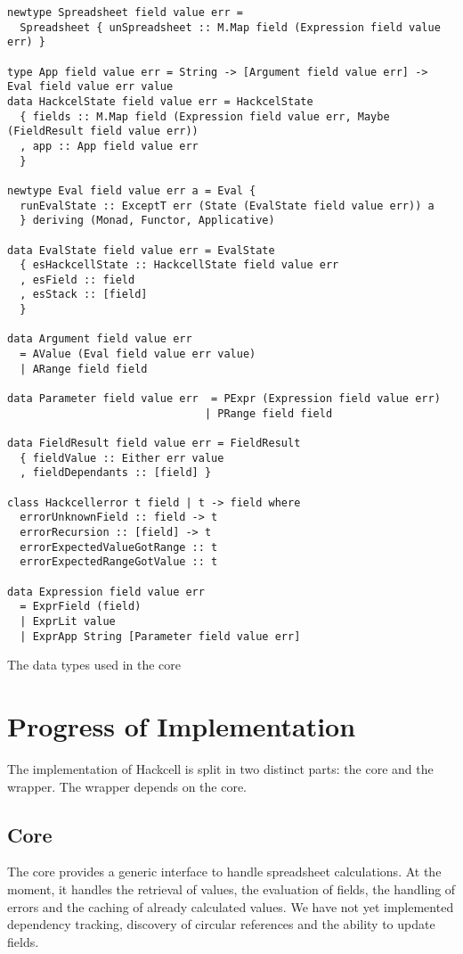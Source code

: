 \documentclass{article}
\begin{document}
	\begin{listing}
	\begin{verbatim}
newtype Spreadsheet field value err =
  Spreadsheet { unSpreadsheet :: M.Map field (Expression field value err) }
     
type App field value err = String -> [Argument field value err] -> Eval field value err value
data HackcelState field value err = HackcelState
  { fields :: M.Map field (Expression field value err, Maybe (FieldResult field value err))
  , app :: App field value err
  }

newtype Eval field value err a = Eval {
  runEvalState :: ExceptT err (State (EvalState field value err)) a
  } deriving (Monad, Functor, Applicative)

data EvalState field value err = EvalState
  { esHackcellState :: HackcellState field value err
  , esField :: field
  , esStack :: [field]
  }

data Argument field value err
  = AValue (Eval field value err value)
  | ARange field field

data Parameter field value err  = PExpr (Expression field value err)
                               | PRange field field
                               
data FieldResult field value err = FieldResult
  { fieldValue :: Either err value
  , fieldDependants :: [field] }

class Hackcellerror t field | t -> field where
  errorUnknownField :: field -> t
  errorRecursion :: [field] -> t
  errorExpectedValueGotRange :: t
  errorExpectedRangeGotValue :: t

data Expression field value err
  = ExprField (field)
  | ExprLit value
  | ExprApp String [Parameter field value err]
	\end{verbatim}
	\caption{The data types used in the core}
	\label{listing:datatypes}
	\end{listing}
	\section{Progress of Implementation}
	The implementation of Hackcell is split in two distinct parts: the core and the wrapper. The wrapper depends on the core.
	\subsection{Core}
	The core provides a generic interface to handle spreadsheet calculations. At the moment, it handles the retrieval of values, the evaluation of fields, the handling of errors and the caching of already calculated values.
	We have not yet implemented dependency tracking, discovery of circular references and the ability to update fields.
\end{document}
